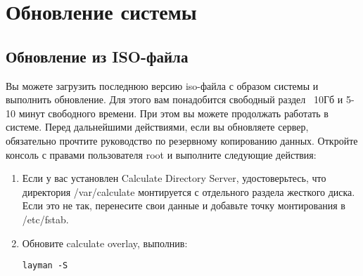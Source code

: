 \section{Обновление системы}
\subsection{Обновление из ISO-файла}
Вы можете загрузить последнюю версию iso-файла с образом системы и выполнить обновление. Для этого вам понадобится свободный раздел ~10Гб и 5-10 минут свободного времени. При этом вы можете продолжать работать в системе. Перед дальнейшими действиями, если вы обновляете сервер, обязательно прочтите руководство по резервному копированию данных.
Откройте консоль с правами пользователя root и выполните следующие действия:
\begin{enumerate}
\item Если у вас установлен Calculate Directory Server, удостоверьтесь, что директория /var/calculate монтируется с отдельного раздела жесткого диска. Если это не так, перенесите свои данные и добавьте точку монтирования в /etc/fstab.
\item Обновите calculate overlay, выполнив:
\begin{verbatim}
layman -S
\end{verbatim}


\end{enumerate}
